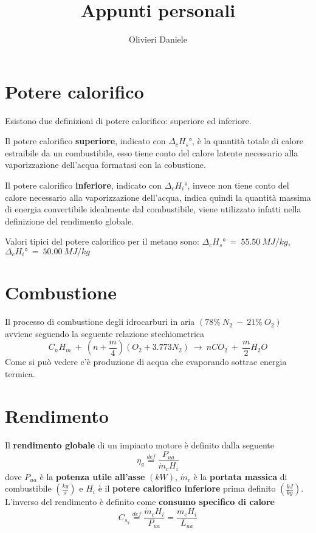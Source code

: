 \documentclass[a4paper,10pt]{article}
\title{Appunti personali}
\author{Olivieri Daniele}
\begin{document}
\maketitle
\section{Potere calorifico}
\label{sec:potere_calorifico}
Esistono due definizioni di potere calorifico: superiore ed inferiore.

Il potere calorifico \textbf{superiore}, indicato con $\Delta_c H_s\text{°}$, è la 
quantità totale di calore estraibile da un combustibile, esso tiene conto del calore 
latente necessario alla vaporizzazione dell'acqua formatasi con la cobustione.

Il potere calorifico \textbf{inferiore}, indicato con $\Delta_c H_i\text{°}$, invece 
non tiene conto del calore necessario alla vaporizzazione dell'acqua, indica quindi 
la quantità massima di energia convertibile idealmente dal combustibile, viene 
utilizzato infatti nella definizione del rendimento globale.

Valori tipici del potere calorifico per il metano sono: $\Delta_c H_s\text{°}\ =\ 
55.50\ MJ/kg$, $\Delta_c H_i\text{°}\ =\ 50.00\ MJ/kg$

\section{Combustione}
\label{sec:combustione}
Il processo di combustione degli idrocarburi in aria $\left(78\%\ N_2\ -\ 21\%\ O_2 
\right)$ avviene seguendo la seguente relazione stechiometrica
\begin{equation}
C_n H_m\ +\ \left(n+\frac{m}{4}\right)\left(O_2+3.773N_2\right)\ \rightarrow\ nCO_2\ 
+\ \frac{m}{2}H_2O
\end{equation}
Come si può vedere c'è produzione di acqua che evaporando sottrae energia termica.

\section{Rendimento}
\label{sec:rendimento}
Il \textbf{rendimento globale} di un impianto motore è definito dalla seguente
\begin{equation}
 \eta_g \stackrel{def}{=} \frac{P_{ua}}{\dot{m}_c H_i}
\end{equation}
dove $P_{ua}$ è la \textbf{potenza utile all'asse} $\left(kW\right)$, $\dot{m}_c$ è 
la \textbf{portata massica} di combustibile $\left(\frac{kg}{s}\right)$ e $H_i$ è il 
\textbf{potere calorifico inferiore} prima definito $\left(\frac{kJ}{kg}\right)$.
L'inverso del rendimento è definito come \textbf{consumo specifico di calore}
\begin{equation}
C_{s_q} \stackrel{def}{=} \frac{\dot{m}_c H_i}{P_{ua}} = \frac{m_c H_i}{L_{ua}}
\end{equation}
\end{document}
